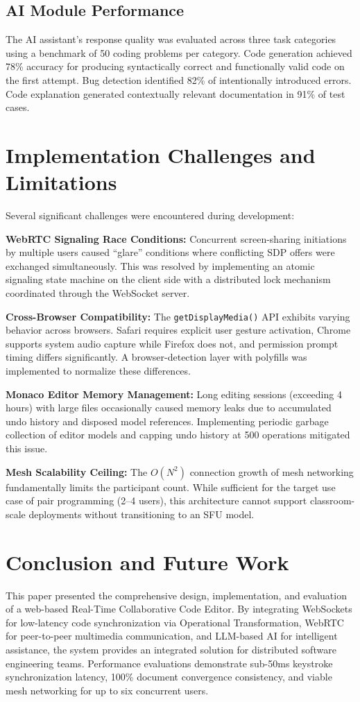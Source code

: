 \documentclass[conference]{IEEEtran}
\begin{document}
\subsection{AI Module Performance}
The AI assistant's response quality was evaluated across three task categories using a benchmark of 50 coding problems per category. Code generation achieved 78\% accuracy for producing syntactically correct and functionally valid code on the first attempt. Bug detection identified 82\% of intentionally introduced errors. Code explanation generated contextually relevant documentation in 91\% of test cases.

\section{Implementation Challenges and Limitations}
Several significant challenges were encountered during development:

\textbf{WebRTC Signaling Race Conditions:} Concurrent screen-sharing initiations by multiple users caused ``glare'' conditions where conflicting SDP offers were exchanged simultaneously. This was resolved by implementing an atomic signaling state machine on the client side with a distributed lock mechanism coordinated through the WebSocket server.

\textbf{Cross-Browser Compatibility:} The \texttt{getDisplayMedia()} API exhibits varying behavior across browsers. Safari requires explicit user gesture activation, Chrome supports system audio capture while Firefox does not, and permission prompt timing differs significantly. A browser-detection layer with polyfills was implemented to normalize these differences.

\textbf{Monaco Editor Memory Management:} Long editing sessions (exceeding 4 hours) with large files occasionally caused memory leaks due to accumulated undo history and disposed model references. Implementing periodic garbage collection of editor models and capping undo history at 500 operations mitigated this issue.

\textbf{Mesh Scalability Ceiling:} The $O(N^2)$ connection growth of mesh networking fundamentally limits the participant count. While sufficient for the target use case of pair programming (2--4 users), this architecture cannot support classroom-scale deployments without transitioning to an SFU model.

\section{Conclusion and Future Work}
This paper presented the comprehensive design, implementation, and evaluation of a web-based Real-Time Collaborative Code Editor. By integrating WebSockets for low-latency code synchronization via Operational Transformation, WebRTC for peer-to-peer multimedia communication, and LLM-based AI for intelligent assistance, the system provides an integrated solution for distributed software engineering teams. Performance evaluations demonstrate sub-50ms keystroke synchronization latency, 100\% document convergence consistency, and viable mesh networking for up to six concurrent users.
\end{document}
